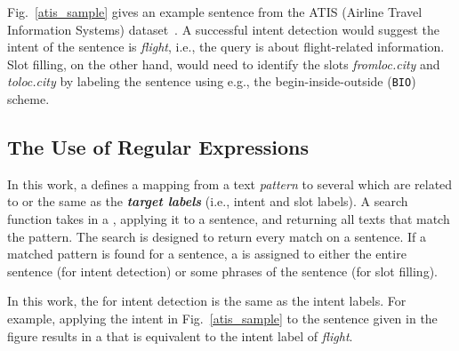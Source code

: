 
 Fig.~\ref{atis_sample} gives an example sentence from the ATIS (Airline Travel Information Systems)
dataset~\cite{hemphill1990atis}. A successful intent detection would suggest the intent of the sentence is \emph{flight}, i.e., the query
is about flight-related information. Slot filling, on the other hand, would need to identify the slots \emph{fromloc.city} and
\emph{toloc.city} by labeling the sentence using e.g., the begin-inside-outside (\texttt{BIO}) scheme.




\subsection{The Use of Regular Expressions}
\label{re_desc}

In this work, a \RE defines a mapping from a text \emph{pattern} to several \textbf{\emph{\REtags}} which are related to or the same as the
\textbf{\emph{target labels}} (i.e., intent and slot labels). A search function takes in a \RE, applying it to a sentence, and returning
all texts that match the pattern. The search is designed to return every match on a sentence. If a matched pattern is found for a sentence,
a \REtag is assigned to either the entire sentence (for intent detection) or some phrases of the sentence (for slot filling).


In this work, the \REtags for intent detection is the same as the intent labels.
For example, applying the intent
\RE in Fig.~\ref{atis_sample} to the sentence given in the figure results in a \REtag that is equivalent to the intent label of
\emph{flight}.


